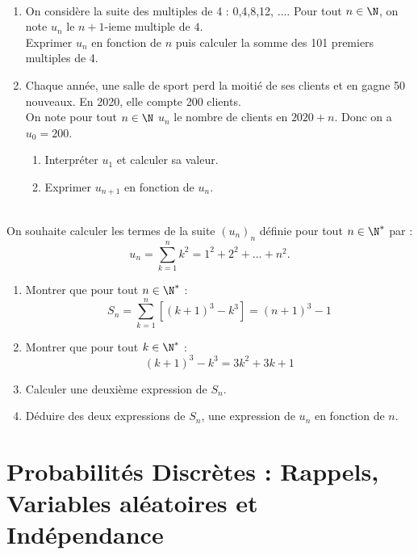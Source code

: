\documentclass[12pt,fleqn]{report} %
\begin{document}
\begin{exercise}\label{Exercice 51}\text{ }\\
	\begin{enumerate}
		\item On considère la suite des multiples de 4 : 0,4,8,12, $\dots$. Pour tout $n\in \N$, on note $u_n$ le $n+1$-ieme multiple de $4$. \\ Exprimer $u_n$ en fonction de $n$ puis calculer la somme des 101 premiers multiples de 4.
		\item Chaque année, une salle de sport perd la moitié de ses clients et en gagne 50 nouveaux. En 2020, elle compte 200 clients. \\ On note pour tout $n\in \N$ $u_n$ le nombre de clients en $2020+n$. Donc on a $u_0 = 200$. \begin{enumerate}
			\item Interpréter $u_1$ et calculer sa valeur.
			\item Exprimer $u_{n+1}$ en fonction de $u_n$.
		\end{enumerate}
	\end{enumerate}
\end{exercise}

\pagebreak
\begin{exercise}\label{Exercice 52}\text{ }\\
	On souhaite calculer les termes de la suite $\left(u_n\right)_n$ définie pour tout $n\in\N^*$ par :
	\[
	u_n = \sum_{k = 1}^{n} k^2 = 1^2 + 2^2 + \dots + n^2.
	\] 
	\begin{enumerate}
		\item Montrer que pour tout $n\in \N^*$ : 
		\[
		S_n = \sum_{k = 1}^n \left[(k+1)^3 - k^3\right] = (n+1)^3 - 1
		\] 
		\item Montrer que pour tout $k\in \N^*$ : \[
		(k+1)^3 - k^3 = 3 k^2 + 3k + 1
		\]
		\item Calculer une deuxième expression de $S_n$.
		\item Déduire des deux expressions de $S_n$, une expression de $u_n$ en fonction de $n$.
	\end{enumerate}
\end{exercise}



\setcounter{chapter}{6}
\chapter{Probabilités Discrètes : Rappels, Variables aléatoires et Indépendance}
\end{document}
